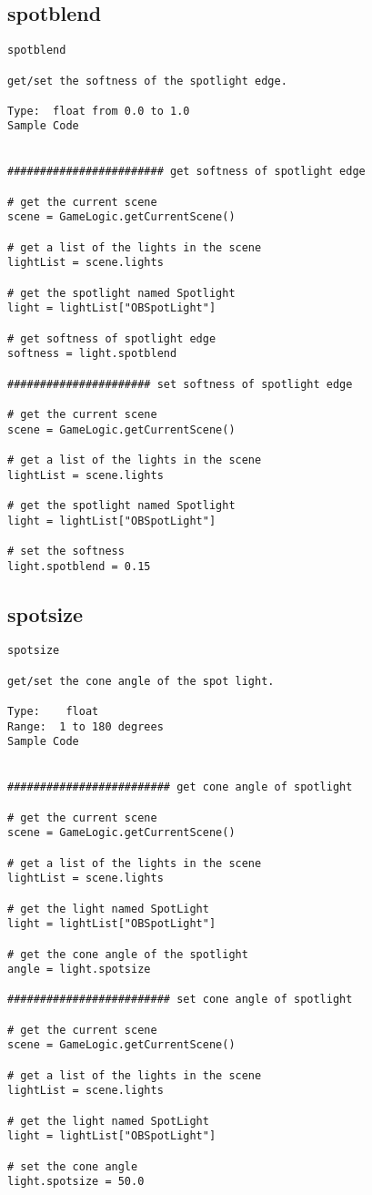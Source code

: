 \subsection{spotblend}
\begin{verbatim}
spotblend

get/set the softness of the spotlight edge.

Type:  float from 0.0 to 1.0
Sample Code


######################## get softness of spotlight edge

# get the current scene
scene = GameLogic.getCurrentScene()

# get a list of the lights in the scene
lightList = scene.lights

# get the spotlight named Spotlight
light = lightList["OBSpotLight"]

# get softness of spotlight edge
softness = light.spotblend

###################### set softness of spotlight edge

# get the current scene
scene = GameLogic.getCurrentScene()

# get a list of the lights in the scene
lightList = scene.lights

# get the spotlight named Spotlight
light = lightList["OBSpotLight"]

# set the softness
light.spotblend = 0.15
\end{verbatim}

\subsection{spotsize}
\begin{verbatim}
spotsize

get/set the cone angle of the spot light.

Type:    float
Range:  1 to 180 degrees
Sample Code


######################### get cone angle of spotlight

# get the current scene
scene = GameLogic.getCurrentScene()

# get a list of the lights in the scene
lightList = scene.lights

# get the light named SpotLight
light = lightList["OBSpotLight"]

# get the cone angle of the spotlight
angle = light.spotsize

######################### set cone angle of spotlight

# get the current scene
scene = GameLogic.getCurrentScene()

# get a list of the lights in the scene
lightList = scene.lights

# get the light named SpotLight
light = lightList["OBSpotLight"]

# set the cone angle
light.spotsize = 50.0
\end{verbatim}

